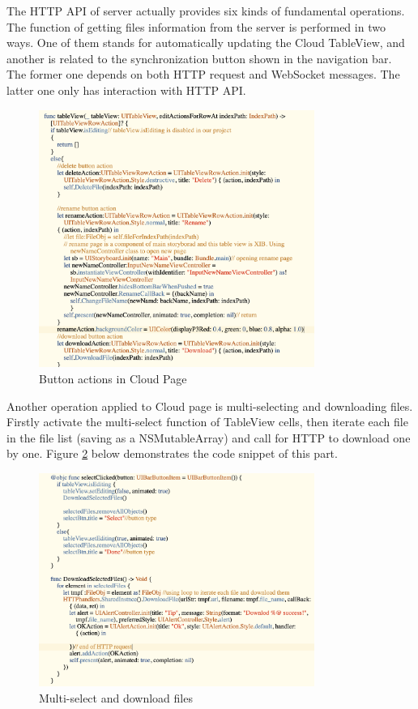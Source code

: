 \documentclass{article}
\begin{document}
The HTTP API of server actually provides six kinds of fundamental operations. The function of getting files information from the server is performed in two ways. One of them stands for automatically updating the Cloud TableView, and another is related to the synchronization button shown in the navigation bar. The former one depends on both HTTP request and WebSocket messages. The latter one only has interaction with HTTP API. 

\begin{figure}[H]
\begin{center}
\includegraphics[width=9cm]{32.png}
\end{center}
\caption{Button actions in Cloud Page}\label{ex4}
\end{figure}

Another operation applied to Cloud page is multi-selecting and downloading files. Firstly activate the multi-select function of TableView cells, then iterate each file in the file list (saving as a NSMutableArray) and call for HTTP to download one by one. Figure \ref{47} below demonstrates the code snippet of this part. 

\begin{figure}[H]
\begin{center}
\includegraphics[width=9cm]{35.png}
\end{center}
\caption{Multi-select and download files}\label{47}
\end{figure}
\end{document}
